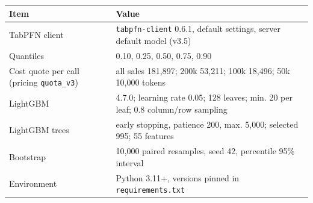 \documentclass[11pt,a4paper]{article}
\begin{document}
\begin{table}[H]
\centering\small
\begin{tabular}{p{5.2cm}p{9.6cm}}
\toprule
Item & Value \\
\midrule
TabPFN client & \texttt{tabpfn-client} 0.6.1, default settings, server default model (v3.5) \\
Quantiles & 0.10, 0.25, 0.50, 0.75, 0.90 \\
Cost quote per call (pricing \texttt{quota\_v3}) & all sales 181,897; 200k 53,211; 100k 18,496; 50k 10,000 tokens \\
LightGBM & 4.7.0; learning rate 0.05; 128 leaves; min. 20 per leaf; 0.8 column/row sampling \\
LightGBM trees & early stopping, patience 200, max. 5,000; selected 995; 55 features \\
Bootstrap & 10,000 paired resamples, seed 42, percentile 95\% interval \\
Environment & Python 3.11+, versions pinned in \texttt{requirements.txt} \\
\bottomrule
\end{tabular}
\end{table}
\end{document}
